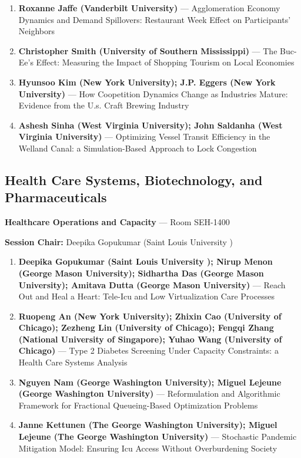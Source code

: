 \documentclass[
  10pt,
  letterpaper,
  DIV=11,
  numbers=noendperiod]{scrartcl}
\begin{document}
\begin{enumerate}
\def\labelenumi{\arabic{enumi}.}
\item
  \textbf{Roxanne Jaffe (Vanderbilt University)} --- Agglomeration
  Economy Dynamics and Demand Spillovers: Restaurant Week Effect on
  Participants' Neighbors
\item
  \textbf{Christopher Smith (University of Southern Mississippi)} ---
  The Buc-Ee's Effect: Measuring the Impact of Shopping Tourism on Local
  Economies
\item
  \textbf{Hyunsoo Kim (New York University); J.P. Eggers (New York
  University)} --- How Coopetition Dynamics Change as Industries Mature:
  Evidence from the U.s. Craft Brewing Industry
\item
  \textbf{Ashesh Sinha (West Virginia University); John Saldanha (West
  Virginia University)} --- Optimizing Vessel Transit Efficiency in the
  Welland Canal: a Simulation-Based Approach to Lock Congestion
\end{enumerate}

\subsection{\texorpdfstring{\textcolor{health}{Health Care Systems, Biotechnology, and Pharmaceuticals}}{}}\label{section-15}

\textbf{Healthcare Operations and Capacity} --- Room SEH-1400

\textbf{Session Chair:} Deepika Gopukumar (Saint Louis University )

\begin{enumerate}
\def\labelenumi{\arabic{enumi}.}
\item
  \textbf{Deepika Gopukumar (Saint Louis University ); Nirup Menon
  (George Mason University); Sidhartha Das (George Mason University);
  Amitava Dutta (George Mason University)} --- Reach Out and Heal a
  Heart: Tele-Icu and Low Virtualization Care Processes
\item
  \textbf{Ruopeng An (New York University); Zhixin Cao (University of
  Chicago); Zezheng Lin (University of Chicago); Fengqi Zhang (National
  University of Singapore); Yuhao Wang (University of Chicago)} --- Type
  2 Diabetes Screening Under Capacity Constraints: a Health Care Systems
  Analysis
\item
  \textbf{Nguyen Nam (George Washington University); Miguel Lejeune
  (George Washington University)} --- Reformulation and Algorithmic
  Framework for Fractional Queueing-Based Optimization Problems
\item
  \textbf{Janne Kettunen (The George Washington University); Miguel
  Lejeune (The George Washington University)} --- Stochastic Pandemic
  Mitigation Model: Ensuring Icu Access Without Overburdening Society
\end{enumerate}
\end{document}
